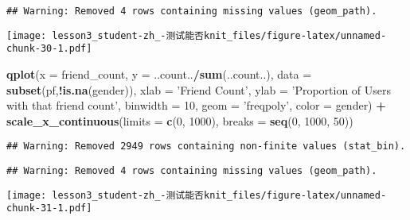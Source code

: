\documentclass[]{article}
\newenvironment{Shaded}{\begin{snugshade}}{\end{snugshade}}
\newcommand{\DataTypeTok}[1]{\textcolor[rgb]{0.13,0.29,0.53}{#1}}
\newcommand{\DecValTok}[1]{\textcolor[rgb]{0.00,0.00,0.81}{#1}}
\newcommand{\KeywordTok}[1]{\textcolor[rgb]{0.13,0.29,0.53}{\textbf{#1}}}
\newcommand{\NormalTok}[1]{#1}
\newcommand{\OperatorTok}[1]{\textcolor[rgb]{0.81,0.36,0.00}{\textbf{#1}}}
\newcommand{\StringTok}[1]{\textcolor[rgb]{0.31,0.60,0.02}{#1}}
\begin{document}
\begin{verbatim}
## Warning: Removed 4 rows containing missing values (geom_path).
\end{verbatim}

\texttt{[image: lesson3\_student-zh\_-测试能否knit\_files/figure-latex/unnamed-chunk-30-1.pdf]}

\begin{Shaded}
\begin{Highlighting}[]
\KeywordTok{qplot}\NormalTok{(}\DataTypeTok{x =}\NormalTok{ friend_count, }\DataTypeTok{y =}\NormalTok{ ..count..}\OperatorTok{/}\KeywordTok{sum}\NormalTok{(..count..),}
      \DataTypeTok{data =} \KeywordTok{subset}\NormalTok{(pf,}\OperatorTok{!}\KeywordTok{is.na}\NormalTok{(gender)), }
      \DataTypeTok{xlab =} \StringTok{'Friend Count'}\NormalTok{,}
      \DataTypeTok{ylab =} \StringTok{'Proportion of Users with that friend count'}\NormalTok{,}
      \DataTypeTok{binwidth =} \DecValTok{10}\NormalTok{,}
      \DataTypeTok{geom =} \StringTok{'freqpoly'}\NormalTok{, }\DataTypeTok{color =}\NormalTok{ gender) }\OperatorTok{+}
\StringTok{  }\KeywordTok{scale_x_continuous}\NormalTok{(}\DataTypeTok{limits =} \KeywordTok{c}\NormalTok{(}\DecValTok{0}\NormalTok{, }\DecValTok{1000}\NormalTok{), }\DataTypeTok{breaks =} \KeywordTok{seq}\NormalTok{(}\DecValTok{0}\NormalTok{, }\DecValTok{1000}\NormalTok{, }\DecValTok{50}\NormalTok{))}
\end{Highlighting}
\end{Shaded}

\begin{verbatim}
## Warning: Removed 2949 rows containing non-finite values (stat_bin).
\end{verbatim}

\begin{verbatim}
## Warning: Removed 4 rows containing missing values (geom_path).
\end{verbatim}

\texttt{[image: lesson3\_student-zh\_-测试能否knit\_files/figure-latex/unnamed-chunk-31-1.pdf]}
\end{document}
